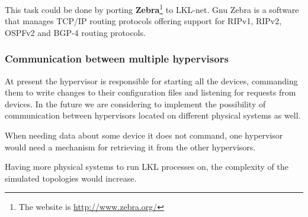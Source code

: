 This task could be done by porting \textbf{Zebra}\footnote{The website is \url{http://www.zebra.org/}} to LKL-net. Gnu Zebra is a software that manages TCP/IP routing protocols offering support for  RIPv1, RIPv2, OSPFv2 and BGP-4 routing protocols.

\subsubsection{Communication between multiple hypervisors}
\label{sec:hypervisor-comm}
At present the hypervisor is responsible for starting all the devices, commanding them to write changes to their configuration files and listening for requests from devices. In the future we are considering to implement the possibility of communication between hypervisors located on different physical systems as well. 

When needing data about some device it does not command, one hypervisor would need a mechanism for retrieving it from the other hypervisors. 

Having more physical systems to run LKL processes on, the complexity of the simulated topologies would increase.
